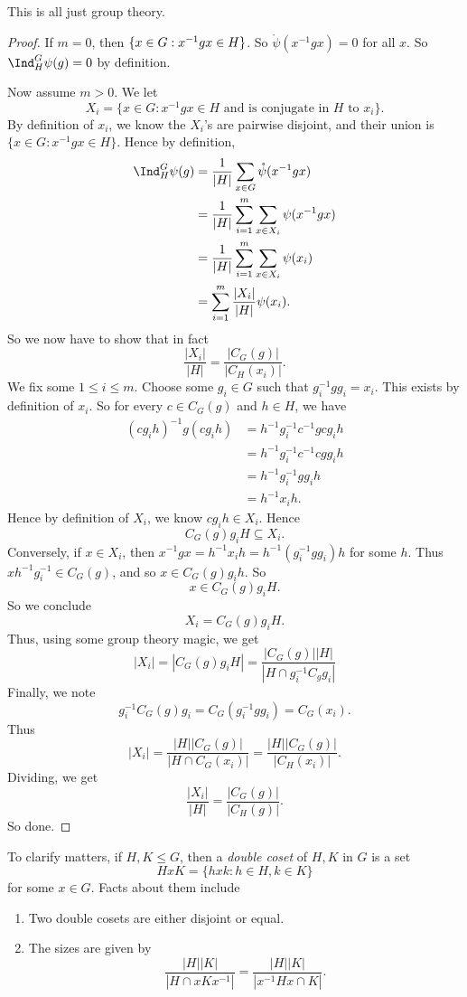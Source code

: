 \documentclass[a4paper]{article}
\begin{document}
This is all just group theory.
\begin{proof}
  If $m = 0$, then $\{x \in G: x^{-1}gx \in H\} \empty$. So $\mathring{\psi}(x^{-1}gx) = 0$ for all $x$. So $\Ind_H^G \psi(g) = 0$ by definition.

  Now assume $m > 0$. We let
  \[
    X_i = \{x \in G: x^{-1}gx \in H\text{ and is conjugate in $H$ to $x_i$}\}.
  \]
  By definition of $x_i$, we know the $X_i$'s are pairwise disjoint, and their union is $\{x \in G: x^{-1}gx \in H\}$. Hence by definition,
  \begin{align*}
    \Ind_H^G \psi(g) &= \frac{1}{|H|} \sum_{x \in G} \mathring{\psi}(x^{-1}gx) \\
    &= \frac{1}{|H|}\sum_{i = 1}^m \sum_{x \in X_i} \psi(x^{-1}gx)\\
    &= \frac{1}{|H|}\sum_{i = 1}^m \sum_{x \in X_i} \psi(x_i)\\
    &= \sum_{i = 1}^m \frac{|X_i|}{|H|} \psi(x_i).
  \end{align*}
  So we now have to show that in fact
  \[
    \frac{|X_i|}{|H|} = \frac{|C_G(g)|}{|C_H(x_i)|}.
  \]
  We fix some $1 \leq i \leq m$. Choose some $g_i \in G$ such that $g_i^{-1} gg_i = x_i$. This exists by definition of $x_i$. So for every $c \in C_G(g)$ and $h \in H$, we have
  \begin{align*}
    (cg_i h)^{-1} g(cg_i h) &= h^{-1} g_i^{-1} c^{-1}gcg_i h \\
    &= h^{-1}g_i^{-1} c^{-1}cg g_ih \\
    &= h^{-1} g_i^{-1}gg_i h \\
    &= h^{-1} x_i h.
  \end{align*}
  Hence by definition of $X_i$, we know $cg_i h \in X_i$. Hence
  \[
    C_G(g) g_i H \subseteq X_i.
  \]
  Conversely, if $x \in X_i$, then $x^{-1}gx = h^{-1} x_i h = h^{-1}(g_i^{-1}g g_i) h$ for some $h$. Thus $xh^{-1}g_i^{-1} \in C_G(g)$, and so $x \in C_G(g) g_i h$. So
  \[
    x \in C_G(g) g_i H.
  \]
  So we conclude
  \[
    X_i = C_G(g) g_i H.
  \]
  Thus, using some group theory magic, we get
  \[
    |X_i| = |C_G(g) g_iH| = \frac{|C_G(g)||H|}{|H \cap g_i^{-1}C_g g_i|}
  \]
  Finally, we note
  \[
    g_i^{-1}C_G(g) g_i = C_G(g_i^{-1} gg_i) = C_G(x_i).
  \]
  Thus
  \[
    |X_i| = \frac{|H||C_G(g)|}{|H\cap C_G(x_i)|} = \frac{|H||C_G(g)|}{|C_H(x_i)|}.
  \]
  Dividing, we get
  \[
    \frac{|X_i|}{|H|} = \frac{|C_G(g)|}{|C_H(g)|}.
  \]
  So done.
\end{proof}
To clarify matters, if $H, K \leq G$, then a \emph{double coset} of $H, K$ in $G$ is a set
\[
  HxK = \{hxk: h \in H, k \in K\}
\]
for some $x \in G$. Facts about them include
\begin{enumerate}
  \item Two double cosets are either disjoint or equal.
  \item The sizes are given by
    \[
      \frac{|H||K|}{|H\cap xKx^{-1}|} = \frac{|H||K|}{|x^{-1}Hx \cap K|}.
    \]
\end{enumerate}
\end{document}
